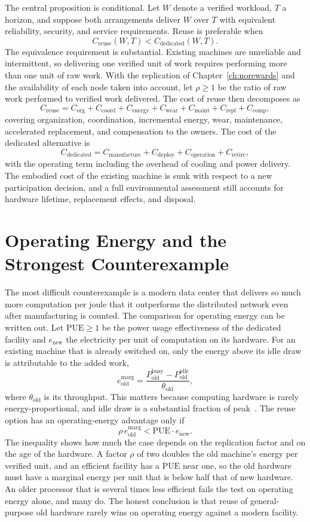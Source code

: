 The central proposition is conditional. Let $W$ denote a verified workload, $T$ a horizon, and suppose both arrangements deliver $W$ over $T$ with equivalent reliability, security, and service requirements. Reuse is preferable when
\[
C_{\mathrm{reuse}}(W,T)<C_{\mathrm{dedicated}}(W,T).
\]
The equivalence requirement is substantial. Existing machines are unreliable and intermittent, so delivering one verified unit of work requires performing more than one unit of raw work. With the replication of Chapter~\ref{ch:norewards} and the availability of each node taken into account, let $\rho\ge1$ be the ratio of raw work performed to verified work delivered. The cost of reuse then decomposes as
\[
C_{\mathrm{reuse}}=C_{\mathrm{org}}+C_{\mathrm{coord}}+C_{\mathrm{energy}}+C_{\mathrm{wear}}+C_{\mathrm{maint}}+C_{\mathrm{repl}}+C_{\mathrm{comp}},
\]
covering organization, coordination, incremental energy, wear, maintenance, accelerated replacement, and compensation to the owners. The cost of the dedicated alternative is
\[
C_{\mathrm{dedicated}}=C_{\mathrm{manufacture}}+C_{\mathrm{deploy}}+C_{\mathrm{operation}}+C_{\mathrm{retire}},
\]
with the operating term including the overhead of cooling and power delivery. The embodied cost of the existing machine is sunk with respect to a new participation decision, and a full environmental assessment still accounts for hardware lifetime, replacement effects, and disposal.

\section{Operating Energy and the Strongest Counterexample}

The most difficult counterexample is a modern data center that delivers so much more computation per joule that it outperforms the distributed network even after manufacturing is counted. The comparison for operating energy can be written out. Let $\mathrm{PUE}\ge1$ be the power usage effectiveness of the dedicated facility and $e_{\mathrm{new}}$ the electricity per unit of computation on its hardware. For an existing machine that is already switched on, only the energy above its idle draw is attributable to the added work,
\[
e^{\mathrm{marg}}_{\mathrm{old}}=\frac{P^{\mathrm{busy}}_{\mathrm{old}}-P^{\mathrm{idle}}_{\mathrm{old}}}{\theta_{\mathrm{old}}},
\]
where $\theta_{\mathrm{old}}$ is its throughput. This matters because computing hardware is rarely energy-proportional, and idle draw is a substantial fraction of peak~\cite{barroso2007}. The reuse option has an operating-energy advantage only if
\[
\rho\,e^{\mathrm{marg}}_{\mathrm{old}}<\mathrm{PUE}\cdot e_{\mathrm{new}}.
\]
The inequality shows how much the case depends on the replication factor and on the age of the hardware. A factor $\rho$ of two doubles the old machine's energy per verified unit, and an efficient facility has a $\mathrm{PUE}$ near one, so the old hardware must have a marginal energy per unit that is below half that of new hardware. An older processor that is several times less efficient fails the test on operating energy alone, and many do. The honest conclusion is that reuse of general-purpose old hardware rarely wins on operating energy against a modern facility.

